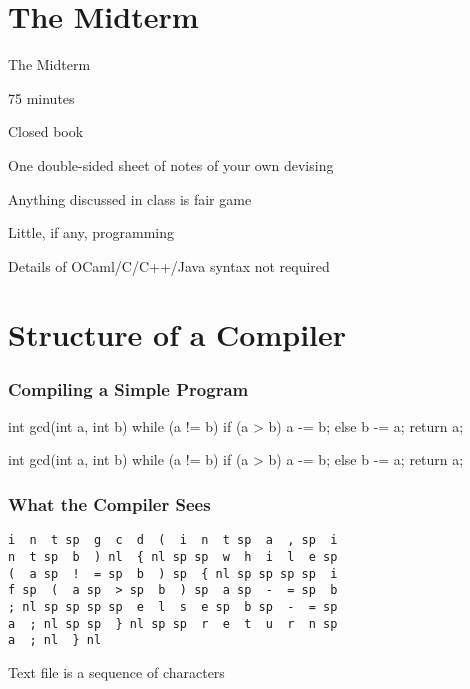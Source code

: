 \documentclass{plt}
\author{Review for the Midterm}
\institute{Columbia University}
\date{Spring 2019}
\begin{document}
\frame{\titlepage}

\frame{\footnotesize\parskip=0pt\tableofcontents}

\section{The Midterm}

\begin{frame}{The Midterm}

75 minutes

Closed book

One double-sided sheet of notes of your own devising

Anything discussed in class is fair game

Little, if any, programming

Details of OCaml/C/C++/Java syntax not required

\end{frame}

\section{Structure of a Compiler}

\begin{frame}[fragile]
  \frametitle{Compiling a Simple Program}

\begin{C}
int gcd(int a, int b)
{
  while (a != b) {
    if (a > b) a -= b;
    else b -= a;
  }
  return a;
}
\end{C}

\end{frame}

\newsavebox{\gcdbox}
\begin{lrbox}{\gcdbox}
\begin{minipage}{0.4\textwidth}
\begin{C}
int gcd(int a, int b)
{
  while (a != b) {
    if (a > b) a -= b;
    else b -= a;
  }
  return a;
}
\end{C}
\end{minipage}
\end{lrbox}


\begin{frame}[fragile]
  \frametitle{What the Compiler Sees}

\usebox{\gcdbox}

\begin{verbatim}
i  n  t sp  g  c  d  (  i  n  t sp  a  , sp  i
n  t sp  b  ) nl  { nl sp sp  w  h  i  l  e sp
(  a sp  !  = sp  b  ) sp  { nl sp sp sp sp  i
f sp  (  a sp  > sp  b  ) sp  a sp  -  = sp  b
; nl sp sp sp sp  e  l  s  e sp  b sp  -  = sp
a  ; nl sp sp  } nl sp sp  r  e  t  u  r  n sp
a  ; nl  } nl
\end{verbatim}

Text file is a sequence of characters

\end{frame}
\end{document}
